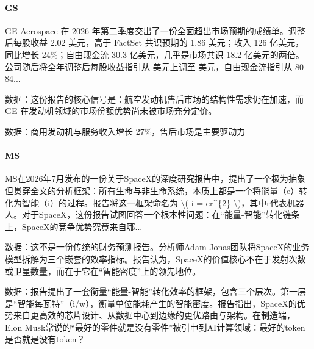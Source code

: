 \documentclass[11pt]{ctexart}
\begin{document}
\paragraph{GS} GE Aerospace 在 2026 年第二季度交出了一份全面超出市场预期的成绩单。调整后每股收益 2.02 美元，高于 FactSet 共识预期的 1.86 美元；收入 126 亿美元，同比增长 24\%；自由现金流 30.3 亿美元，几乎是市场共识 18.2 亿美元的两倍。公司随后将全年调整后每股收益指引从 美元上调至 美元，自由现金流指引从 80-84...
{\small\color{refgray}数据：这份报告的核心信号是：航空发动机售后市场的结构性需求仍在加速，而 GE 在发动机领域的市场份额优势尚未被市场充分定价。\par}
{\small\color{refgray}数据：商用发动机与服务收入增长 27\%，售后市场是主要驱动力\par}
\paragraph{MS} MS在2026年7月发布的一份关于SpaceX的深度研究报告中，提出了一个极为抽象但贯穿全文的分析框架：所有生命与非生命系统，本质上都是一个将能量（e）转化为智能（i）的过程。报告将这一框架命名为 \textbackslash{}( i = er\textasciicircum{}\{2\} \textbackslash{})，其中r代表机器人。对于SpaceX，这份报告试图回答一个根本性问题：在“能量-智能”转化链条上，SpaceX的竞争优势究竟来自哪...
{\small\color{refgray}数据：这不是一份传统的财务预测报告。分析师Adam Jonas团队将SpaceX的业务模型拆解为三个嵌套的效率指标。报告认为，SpaceX的价值核心不在于发射次数或卫星数量，而在于它在“智能密度”上的领先地位。\par}
{\small\color{refgray}数据：报告提出了一套衡量“能量-智能”转化效率的框架，包含三个层次。第一层是“智能每瓦特”（i/w），衡量单位能耗产生的智能密度。报告指出，SpaceX的优势来自更高效的芯片设计、从数据中心到边缘的更优路由与架构。在制造端，Elon Musk常说的“最好的零件就是没有零件”被引申到AI计算领域：最好的token是否就是没有token？\par}
\end{document}
